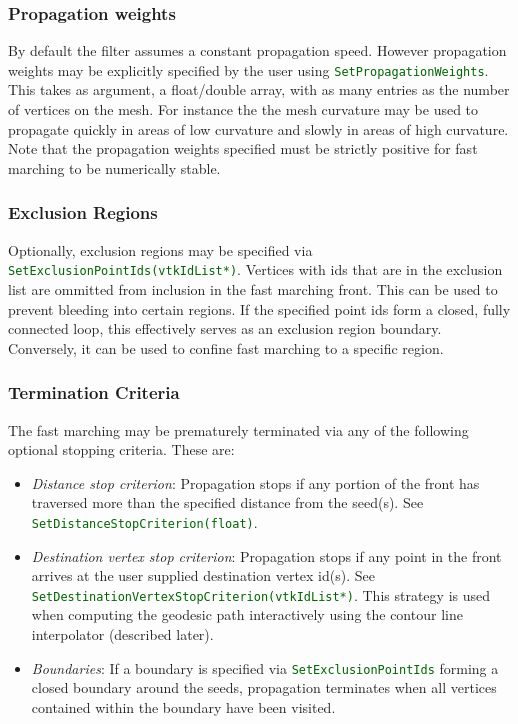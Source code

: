 \documentclass{InsightArticle}
\def\code#1{\small\textcolor{darkgreen}{\texttt{#1}}}
\begin{document}
\subsubsection{Propagation weights}
By default the filter assumes a constant propagation speed. However propagation weights may be explicitly specified by the user using \code{SetPropagationWeights}. This takes as argument, a float/double array, with as many entries as the number of vertices on the mesh. For instance the the mesh curvature may be used to propagate quickly in areas of low curvature and slowly in areas of high curvature. Note that the propagation weights specified must be strictly positive for fast marching to be numerically stable.

\subsubsection{Exclusion Regions}
Optionally, exclusion regions may be specified via \code{SetExclusionPointIds(vtkIdList*)}. Vertices with ids that are in the exclusion list are ommitted from inclusion in the fast marching front. This can be used to prevent bleeding into certain regions. If the specified point ids form a closed, fully connected loop, this effectively serves as an exclusion region boundary. Conversely, it can be used to confine fast marching to a specific region.

\subsubsection{Termination Criteria}
The fast marching may be prematurely terminated via any of the following optional
stopping criteria. These are:

\begin{itemize}
\item \textit{Distance stop criterion}: Propagation stops if any portion of the
front has traversed more than the specified distance from the seed(s).
See \code{SetDistanceStopCriterion(float)}. 
\item \textit{Destination vertex stop criterion}: Propagation stops if any
point in the front arrives at the user supplied destination vertex id(s).
See \code{SetDestinationVertexStopCriterion(vtkIdList*)}. This strategy is used when computing the geodesic
path interactively using the contour line interpolator (described later).
\item \textit{Boundaries}: If a boundary is specified via \code{SetExclusionPointIds} forming a closed boundary around the seeds, propagation terminates when all vertices contained within the boundary have been visited.
\end{itemize}
\end{document}
